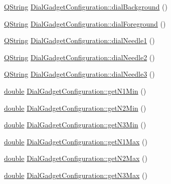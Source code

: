 \begin{DoxyCompactItemize}
\item 
\hyperlink{group___u_a_v_objects_plugin_gab9d252f49c333c94a72f97ce3105a32d}{Q\-String} \hyperlink{group___dial_plugin_ga42da3303d7a4c92c6123be6942435f47}{Dial\-Gadget\-Configuration\-::dial\-Background} ()
\item 
\hyperlink{group___u_a_v_objects_plugin_gab9d252f49c333c94a72f97ce3105a32d}{Q\-String} \hyperlink{group___dial_plugin_ga516d8434f4958c9501f14624621908b8}{Dial\-Gadget\-Configuration\-::dial\-Foreground} ()
\item 
\hyperlink{group___u_a_v_objects_plugin_gab9d252f49c333c94a72f97ce3105a32d}{Q\-String} \hyperlink{group___dial_plugin_ga30ac2e08e3864b71a35da761cfdcfc5e}{Dial\-Gadget\-Configuration\-::dial\-Needle1} ()
\item 
\hyperlink{group___u_a_v_objects_plugin_gab9d252f49c333c94a72f97ce3105a32d}{Q\-String} \hyperlink{group___dial_plugin_ga08a35848cfbe48ecdb7c63f3a3f461b8}{Dial\-Gadget\-Configuration\-::dial\-Needle2} ()
\item 
\hyperlink{group___u_a_v_objects_plugin_gab9d252f49c333c94a72f97ce3105a32d}{Q\-String} \hyperlink{group___dial_plugin_gacca23f23b817f81e3956ef1bb758dcd7}{Dial\-Gadget\-Configuration\-::dial\-Needle3} ()
\item 
\hyperlink{_super_l_u_support_8h_a8956b2b9f49bf918deed98379d159ca7}{double} \hyperlink{group___dial_plugin_ga09c2b5e2f5c5666cb9f0a0fde52dbb8f}{Dial\-Gadget\-Configuration\-::get\-N1\-Min} ()
\item 
\hyperlink{_super_l_u_support_8h_a8956b2b9f49bf918deed98379d159ca7}{double} \hyperlink{group___dial_plugin_ga0d4493d4a59c40439e7d22de908b5f81}{Dial\-Gadget\-Configuration\-::get\-N2\-Min} ()
\item 
\hyperlink{_super_l_u_support_8h_a8956b2b9f49bf918deed98379d159ca7}{double} \hyperlink{group___dial_plugin_ga4006135115987335ad060540e13b84c6}{Dial\-Gadget\-Configuration\-::get\-N3\-Min} ()
\item 
\hyperlink{_super_l_u_support_8h_a8956b2b9f49bf918deed98379d159ca7}{double} \hyperlink{group___dial_plugin_ga8a4ca5378ff9f7cbbbaa8606d12969b9}{Dial\-Gadget\-Configuration\-::get\-N1\-Max} ()
\item 
\hyperlink{_super_l_u_support_8h_a8956b2b9f49bf918deed98379d159ca7}{double} \hyperlink{group___dial_plugin_ga555504dee11630dd0129fbac45ede1b7}{Dial\-Gadget\-Configuration\-::get\-N2\-Max} ()
\item 
\hyperlink{_super_l_u_support_8h_a8956b2b9f49bf918deed98379d159ca7}{double} \hyperlink{group___dial_plugin_ga3f7e435241bf176b23d3fa49ca1c18ee}{Dial\-Gadget\-Configuration\-::get\-N3\-Max} ()

\end{DoxyCompactItemize}
